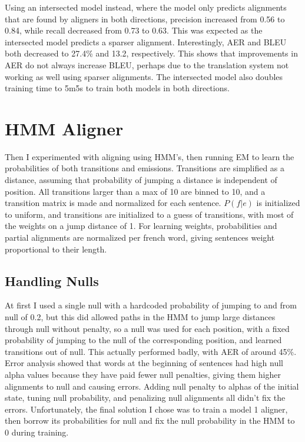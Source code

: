 \documentclass[11pt]{article}
\begin{document}
Using an intersected model instead, where the model only predicts alignments that are found by
aligners in both directions, precision increased from 0.56 to 0.84, while recall decreased from
0.73 to 0.63. This was expected as the intersected model predicts a sparser alignment.
Interestingly, AER and BLEU both decreased to 27.4\% and 13.2, respectively. This shows that
improvements in AER do not always increase BLEU, perhaps due to the translation system
not working as well using sparser alignments. The intersected model also doubles training time
to 5m5s to train both models in both directions.

\section{HMM Aligner}

Then I experimented with aligning using HMM's, then running EM to learn the probabilities of
both transitions and emissions. Transitions are simplified as a distance, assuming that
probability of jumping a distance is independent of position. All transitions larger than
a max of 10 are binned to 10, and a transition matrix is made and normalized for each sentence. 
$P(f|e)$ is initialized to uniform, and transitions
are initialized to a guess of transitions, with most of the weights on a jump distance of 1.
For learning weights, probabilities and partial alignments are normalized per french word,
giving sentences weight proportional to their length.

\subsection{Handling Nulls}
At first I used a single null with a hardcoded probability of jumping to and from null of 0.2,
but this did allowed paths in the HMM to jump large distances through null without penalty,
so a null was used for each position, with a fixed probability of jumping to the null of 
the corresponding position, and learned transitions out of null. This actually performed
badly, with AER of around 45\%. Error analysis showed that words at the beginning of sentences
had high null alpha values because they have paid fewer null penalties, 
giving them higher alignments to null and causing errors. Adding null penalty to alphas of
the initial state, tuning null probability, and penalizing null alignments 
all didn't fix the errors. Unfortunately, the final solution I chose was to train a
model 1 aligner, then borrow its probabilities for null and fix the null probability in the
HMM to 0 during training. 
\end{document}
